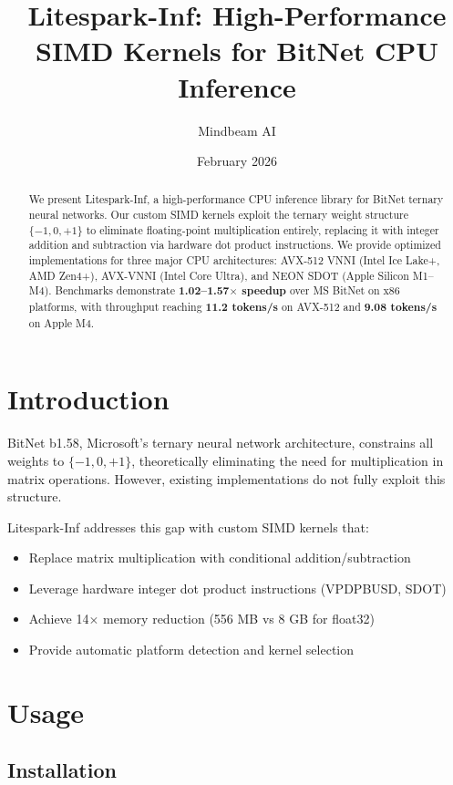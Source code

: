 \documentclass[11pt,a4paper]{article}
\title{\textbf{Litespark-Inf: High-Performance SIMD Kernels for BitNet CPU Inference}}
\author{Mindbeam AI}
\date{February 2026}
\begin{document}
\maketitle

\begin{abstract}
We present Litespark-Inf, a high-performance CPU inference library for BitNet ternary neural networks. Our custom SIMD kernels exploit the ternary weight structure $\{-1, 0, +1\}$ to eliminate floating-point multiplication entirely, replacing it with integer addition and subtraction via hardware dot product instructions. We provide optimized implementations for three major CPU architectures: AVX-512 VNNI (Intel Ice Lake+, AMD Zen4+), AVX-VNNI (Intel Core Ultra), and NEON SDOT (Apple Silicon M1--M4). Benchmarks demonstrate \textbf{1.02--1.57$\times$ speedup} over MS BitNet on x86 platforms, with throughput reaching \textbf{11.2 tokens/s} on AVX-512 and \textbf{9.08 tokens/s} on Apple M4.
\end{abstract}

\section{Introduction}

BitNet b1.58, Microsoft's ternary neural network architecture, constrains all weights to $\{-1, 0, +1\}$, theoretically eliminating the need for multiplication in matrix operations. However, existing implementations do not fully exploit this structure.

Litespark-Inf addresses this gap with custom SIMD kernels that:
\begin{itemize}
    \item Replace matrix multiplication with conditional addition/subtraction
    \item Leverage hardware integer dot product instructions (VPDPBUSD, SDOT)
    \item Achieve 14$\times$ memory reduction (556 MB vs 8 GB for float32)
    \item Provide automatic platform detection and kernel selection
\end{itemize}

\section{Usage}

\subsection{Installation}
\end{document}
